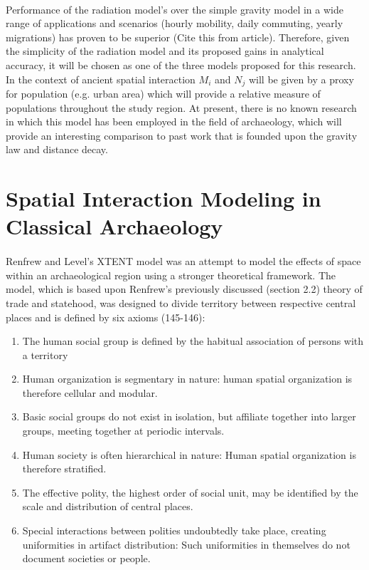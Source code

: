 \documentclass[12pt,a4paper]{thesis}
\begin{document}
\paragraph{}	
Performance of the radiation model's over the simple gravity model in a wide range of applications and scenarios (hourly mobility, daily commuting, yearly migrations) has proven to be superior (Cite this from article). Therefore, given the simplicity of the radiation model and its proposed gains in analytical accuracy, it will be chosen as one of the three models proposed for this research. In the context of ancient spatial interaction $M_{i}$ and $N_{j}$ will be given by a proxy for population (e.g. urban area) which will provide a relative measure of populations throughout the study region. At present, there is no known research in which this model has been employed in the field of archaeology, which will provide an interesting comparison to past work that is founded upon the gravity law and distance decay.

\section{Spatial Interaction Modeling in Classical Archaeology}

\paragraph{}	
Renfrew and Level's XTENT model \citeyearpar{RenLev79} was an attempt to model the effects of space within an archaeological region using a stronger theoretical framework. The model, which is based upon Renfrew's previously discussed (section 2.2)  theory of trade and statehood, was designed to divide territory between respective central places and is defined by six  axioms (145-146):

	
\begin{enumerate}
\item The human social group is defined by the habitual association of persons with a territory
\item Human organization is segmentary in nature: human spatial organization is therefore cellular and modular.
\item Basic social groups do not exist in isolation, but affiliate together into larger groups, meeting together at periodic intervals. 
\item Human society is often hierarchical in nature: Human spatial organization is therefore 	stratified.
\item The effective polity, the highest order of social unit, may be identified by the scale and 	distribution of central places.
\item Special interactions between polities undoubtedly take place, creating uniformities in 	artifact distribution: Such uniformities in themselves do not document societies or people.
\end{enumerate}
\end{document}
